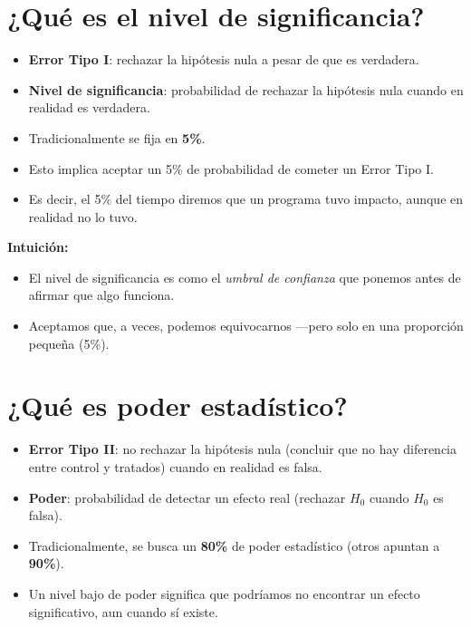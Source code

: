\documentclass[12pt]{article}
\begin{document}
\section*{\noindent\textbf{¿Qué es el nivel de significancia?}}

\begin{itemize}
    \item \textbf{Error Tipo I}: rechazar la hipótesis nula a pesar de que es verdadera.
    \item \textbf{Nivel de significancia}: probabilidad de rechazar la hipótesis nula cuando en realidad es verdadera.
    \item Tradicionalmente se fija en \textbf{5\%}.
    \item Esto implica aceptar un 5\% de probabilidad de cometer un Error Tipo I.
    \item Es decir, el 5\% del tiempo diremos que un programa tuvo impacto, aunque en realidad no lo tuvo.
\end{itemize}

\textbf{Intuición:}
\begin{itemize}
    \item El nivel de significancia es como el \textit{umbral de confianza} que ponemos antes de afirmar que algo funciona.
    \item Aceptamos que, a veces, podemos equivocarnos —pero solo en una proporción pequeña (5\%).
\end{itemize}

\section*{\noindent\textbf{¿Qué es poder estadístico?}}

\begin{itemize}
    \item \textbf{Error Tipo II}: no rechazar la hipótesis nula (concluir que no hay diferencia entre control y tratados) cuando en realidad es falsa.
    \item \textbf{Poder}: probabilidad de detectar un efecto real (rechazar $H_0$ cuando $H_0$ es falsa).
    \item Tradicionalmente, se busca un \textbf{80\%} de poder estadístico (otros apuntan a \textbf{90\%}).
    \item Un nivel bajo de poder significa que podríamos no encontrar un efecto significativo, aun cuando sí existe.
\end{itemize}
\end{document}
